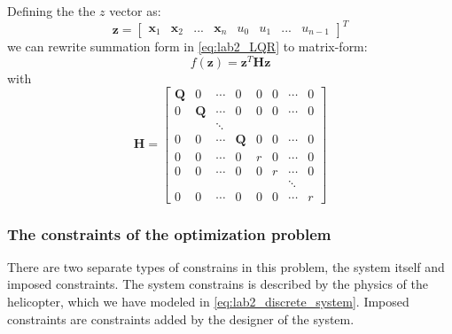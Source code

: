\documentclass[../main.tex]{subfiles}
\begin{document}
Defining the the $z$ vector as:
\begin{equation}\label{eq:lab2_z}
	\bm z = \begin{bmatrix}
		\bm x_1 & \bm x_2 & ... & \bm x_n & u_0 & u_1 &... & u_{n-1} 
	\end{bmatrix}^T
\end{equation}
we can rewrite summation form in \cref{eq:lab2_LQR} to matrix-form:
\begin{equation}\label{eq:lab2_quadprog}
	f(\bm z) = \bm z^T \bm H \bm z
\end{equation}
with
\begin{equation}\label{eq:lab2_H}
	\bm H = \begin{bmatrix}
		\bm Q & 0 & \cdots  & 0 & 0 & 0 & \cdots & 0\\
		0 & \bm Q & \cdots  & 0 & 0 & 0 & \cdots & 0\\
		 & & \ddots &  &  &  &  & \\
		0 & 0 & \cdots & \bm Q & 0 & 0  & \cdots & 0\\
		0 & 0 & \cdots & 0 & r & 0  & \cdots & 0\\
		0 & 0 & \cdots & 0 & 0 & r  & \cdots & 0\\
		 & &  &  &  &  & \ddots & \\
		0 & 0 & \cdots & 0 & 0 & 0  & \cdots & r
	\end{bmatrix}
\end{equation}


\subsubsection{The constraints of the optimization problem} \label{sec:lab2_constraints}
There are two separate types of constrains in this problem, the system itself and imposed constraints. The system constrains is described by the physics of the helicopter, which we have modeled in \cref{eq:lab2_discrete_system}. Imposed constraints are constraints added by the designer of the system. 
\end{document}
